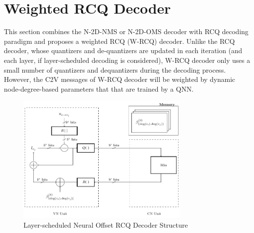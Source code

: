 \documentclass [PhD] {uclathes}
\begin{document}
\section{Weighted RCQ Decoder}\label{sec: W-RCQ}
This section combines the N-2D-NMS or N-2D-OMS decoder with RCQ decoding paradigm and proposes a weighted RCQ (W-RCQ) decoder. Unlike the RCQ decoder, whose quantizers and de-quantizers are updated in each iteration (and each layer, if layer-scheduled decoding is considered), W-RCQ decoder only uses a small number of quantizers and dequantizers during the decoding process. However, the C2V messages of W-RCQ decoder will be weighted by dynamic node-degree-based parameters that that are trained by a QNN.
\begin{figure}[t]
	\centering
	\includegraphics[width=20pc]{figures/neural_rcq.pdf}
	\caption{Layer-scheduled Neural Offset RCQ Decoder Structure}
    \label{fig: layered_neural_RCQ_str}
\end{figure}
\end{document}
